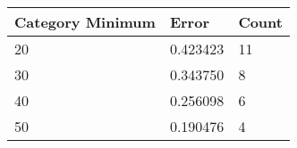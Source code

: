 \begin{tabular}{p{2cm}|p{1.8cm}|p{1.4cm}}
\toprule
 Category Minimum &    Error  &  Count \\
\midrule
               20 & 0.423423 &     11 \\
               30 & 0.343750 &      8 \\
               40 & 0.256098 &      6 \\
               50 & 0.190476 &      4 \\
\bottomrule
\end{tabular}
